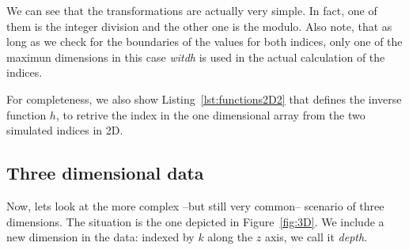We can see that the transformations are actually very simple.
In fact, one of them is the integer division and the other one is the modulo.
Also note, that as long as we check for the boundaries of the values for both indices, only one of the maximun dimensions in this case \emph{witdh} is used in the actual calculation of the indices.

{\centering
\begin{minipage}{\linewidth}
\end{minipage}
\par
}
\vspace{0.5cm}

For completeness, we also show Listing~\ref{lst:functions2D2} that defines the inverse function $h$, to retrive the index in the one dimensional array from the two simulated indices in 2D.

{\centering
\begin{minipage}{\linewidth}
\end{minipage}
\par
}
\vspace{0.5cm}

\subsection{Three dimensional data}

Now, lets look at the more complex --but still very common-- scenario of three dimensions. The situation is the one depicted in Figure~\ref{fig:3D}. We include a new dimension in the data: indexed by $k$ along the $z$ axis, we call it \emph{depth}.

